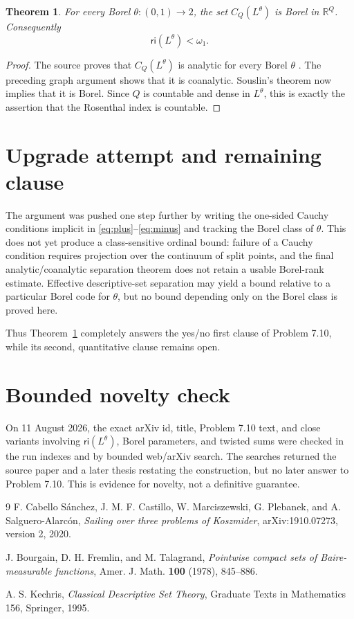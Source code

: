 \documentclass[11pt]{article}
\newtheorem{theorem}{Theorem}
\newcommand{\R}{\mathbb R}
\newcommand{\ri}{\mathsf{ri}}
\begin{document}
\begin{theorem}\label{thm:main}
For every Borel $\theta:(0,1)\to2$, the set $C_Q(L^\theta)$ is Borel in $\R^Q$.  Consequently
\[
 \ri(L^\theta)<\omega_1.
\]
\end{theorem}

\begin{proof}
The source proves that $C_Q(L^\theta)$ is analytic for every Borel $\theta$ \cite[Lemma 7.8]{Source}.  The preceding graph argument shows that it is coanalytic.  Souslin's theorem now implies that it is Borel.  Since $Q$ is countable and dense in $L^\theta$, this is exactly the assertion that the Rosenthal index is countable.
\end{proof}

\section*{Upgrade attempt and remaining clause}
The argument was pushed one step further by writing the one-sided Cauchy conditions implicit in \eqref{eq:plus}--\eqref{eq:minus} and tracking the Borel class of $\theta$.  This does not yet produce a class-sensitive ordinal bound: failure of a Cauchy condition requires projection over the continuum of split points, and the final analytic/coanalytic separation theorem does not retain a usable Borel-rank estimate.  Effective descriptive-set separation may yield a bound relative to a particular Borel code for $\theta$, but no bound depending only on the Borel class is proved here.

Thus Theorem~\ref{thm:main} completely answers the yes/no first clause of Problem 7.10, while its second, quantitative clause remains open.

\section*{Bounded novelty check}
On 11 August 2026, the exact arXiv id, title, Problem 7.10 text, and close variants involving $\ri(L^\theta)$, Borel parameters, and twisted sums were checked in the run indexes and by bounded web/arXiv search.  The searches returned the source paper and a later thesis restating the construction, but no later answer to Problem 7.10.  This is evidence for novelty, not a definitive guarantee.

\begin{thebibliography}{9}
F. Cabello S\'anchez, J. M. F. Castillo, W. Marciszewski,
G. Plebanek, and A. Salguero-Alarc\'on,
\emph{Sailing over three problems of Koszmider}, arXiv:1910.07273, version 2, 2020.

J. Bourgain, D. H. Fremlin, and M. Talagrand,
\emph{Pointwise compact sets of Baire-measurable functions},
Amer. J. Math. \textbf{100} (1978), 845--886.

A. S. Kechris,
\emph{Classical Descriptive Set Theory}, Graduate Texts in Mathematics 156,
Springer, 1995.
\end{thebibliography}
\end{document}
